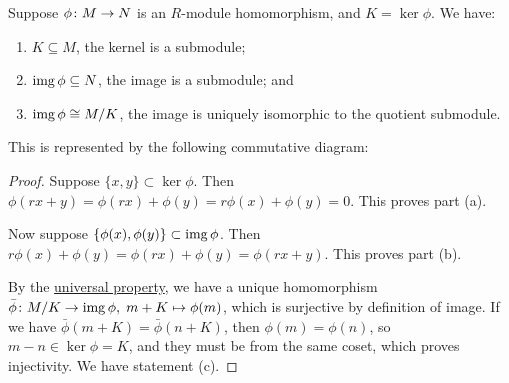 \begin{theorem}\label{thm:iso-1-mod}
    Suppose \(\phi\colon M\to N\) is an \(R\)-module homomorphism,
    and \(K = \ker\phi\). We have:
    \begin{enumerate}[label={(\alph*)}, itemsep=0mm]
        \item \(K \subseteq M\), the kernel is a submodule;
        \item \(\operatorname{img}\phi \subseteq N\), the image is a submodule; and
        \item \(\operatorname{img}\phi \cong M/K\), the image is uniquely isomorphic to the quotient submodule.
    \end{enumerate}
    This is represented by the following commutative diagram:
    \begin{center}
    \end{center}
\end{theorem}
\begin{proof}
    Suppose \(\{x,y\} \subset \ker\phi\).
    Then \(\phi(rx+y) = \phi(rx) + \phi(y) = r\phi(x) + \phi(y) = 0\).
    This proves part (a).

    Now suppose \(\{\phi(x),\phi(y)\} \subset \operatorname{img}\phi\).
    Then \(r\phi(x)+\phi(y) = \phi(rx)+\phi(y) = \phi(rx+y)\).
    This proves part (b).

    By the \hyperref[thm:univ-prop-quotient-mod]{universal property},
    we have a unique homomorphism \(\bar{\phi}\colon M/K\to\operatorname{img}\phi,\;m+K\mapsto\phi(m)\),
    which is surjective by definition of image.
    If we have \(\bar{\phi}(m+K) = \bar{\phi}(n+K)\),
    then \(\phi(m) = \phi(n)\),
    so \(m-n \in \ker\phi = K\),
    and they must be from the same coset,
    which proves injectivity.
    We have statement (c).
\end{proof}





